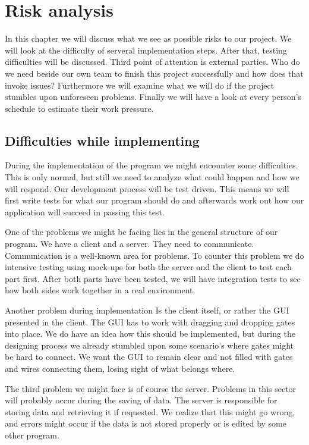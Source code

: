 \documentclass[a4paper]{article}
\begin{document}
\section{Risk analysis}
In this chapter we will discuss what we see as possible risks to our project. We will look at the difficulty of serveral implementation steps. After that, testing difficulties will be discussed. Third point of attention is external parties. Who do we need beside our own team to finish this project successfully and how does that invoke issues? Furthermore we will examine what we will do if the project stumbles upon unforeseen problems. Finally we will have a look at every person’s schedule to estimate their work pressure.

\subsection{Difficulties while implementing}
During the implementation of the program we might encounter some difficulties. This is only normal, but still we need to analyze what could happen and how we will respond. Our development process will be test driven. This means we will first write tests for what our program should do and afterwards work out how our application will succeed in passing this test.
 
One of the problems we might be facing lies in the general structure of our program. We have a client and a server. They need to communicate. Communication is a well-known area for problems. To counter this problem we do intensive testing using mock-ups for both the server and the client to test each part first. After both parts have been tested, we will have integration tests to see how both sides work together in a real environment. 

Another problem during implementation Is the client itself, or rather the GUI presented in the client. The GUI has to work with dragging and dropping gates into place. We do have an idea how this should be implemented, but during the designing process we already stumbled upon some scenario’s where gates might be hard to connect. We want the GUI to remain clear and not filled with gates and wires connecting them, losing sight of what belongs where.

The third problem we might face is of course the server. Problems in this sector will probably occur during the saving of data. The server is responsible for storing data and retrieving it if requested. We realize that this might go wrong, and errors might occur if the data is not stored properly or is edited by some other program. 
\end{document}
